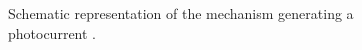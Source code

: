 \begin{figure}[h]
    \centering
    
    \caption{Schematic representation of the mechanism generating 
    a photocurrent \citep{memming2008-1,bard2002-1}.}
    \label{fig_photocurrent_generation}
\end{figure}